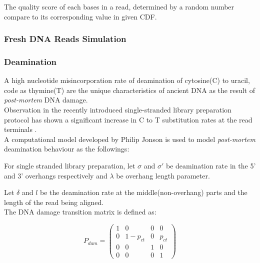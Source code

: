 \documentclass[11pt,a4paper]{report}
\begin{document}
The quality score of each bases in a read, determined by a random number compare to 
its corresponding value in given CDF.


\subsubsection{Fresh DNA Reads Simulation} \label{Fresh DNA Reads Simulation}












\subsubsection{Deamination} \label{Deamination}

A high nucleotide misincorporation rate of  deamination of cytosine(C) to uracil, 
code as thymine(T) are the unique characteristics of ancient DNA as the result 
of \emph{post-mortem} DNA damage\cite{mapdamage2}\cite{damagepattern}.\\ 

Observation in the recently introduced single-stranded library preparation protocol
has shown a significant increase in C to T substitution rates at the read terminals
\cite{mapdamage2}.\\

A computational model developed by Philip Jonson \cite{mapdamage2} is used to model
\emph{post-mortem} deamination behaviour as the followings:

For single stranded library preparation,
let $\sigma$ and $\sigma\prime $ be deamination rate in the 5' and 3' overhangs 
respectively and $\lambda$ be overhang length parameter. 

Let  $\delta$ and $l$ be the deamination rate at the middle(non-overhang) parts 
and the length of the read being aligned.\\

The DNA damage transition matrix is defined as:

$$ P_{dam} = 
 \begin{pmatrix}
  1 & 0 & 0 & 0 \\
  0 & 1-p_{ct} & 0 & p_{ct} \\
  0  & 0  & 1 & 0  \\
  0 & 0 & 0 & 1 
 \end{pmatrix}$$
 
\end{document}
